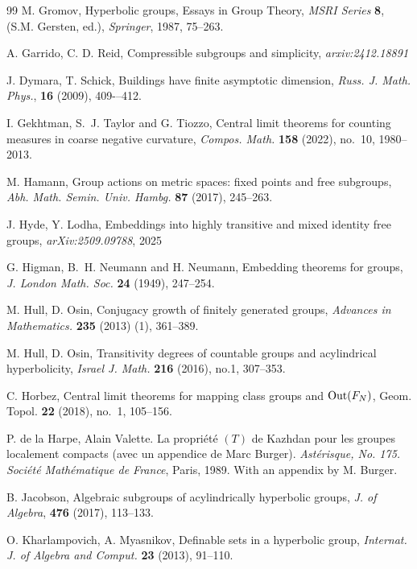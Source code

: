 \documentclass[11pt,letterpaper]{article}
\theoremstyle{definition}
\theoremstyle{remark}
\begin{document}
\begin{thebibliography}{99}
M. Gromov, Hyperbolic groups, Essays in Group Theory, \emph{MSRI Series} \textbf{8}, (S.M. Gersten, ed.), \emph{Springer}, 1987, 75--263.

A. Garrido, C. D. Reid, Compressible subgroups and simplicity, {\it arxiv:2412.18891}

J. Dymara, T. Schick, Buildings have finite asymptotic dimension, \emph{Russ. J. Math. Phys.}, \textbf{16} (2009), 409-–412.

I. Gekhtman, S.~J. Taylor and G. Tiozzo, Central limit theorems for counting measures in coarse negative curvature, \emph{Compos. Math.} {\bf 158} (2022), no.~10, 1980--2013.


M. Hamann, Group actions on metric spaces: fixed points and free subgroups, \emph{Abh. Math. Semin. Univ. Hambg.} \textbf{87} (2017), 245--263.

J. Hyde, Y. Lodha, Embeddings into highly transitive and mixed identity free groups, \emph{arXiv:2509.09788}, 2025

G. Higman, B.~H. Neumann and H. Neumann, Embedding theorems for groups, \emph{J. London Math. Soc.} {\bf 24} (1949), 247--254.

M. Hull, D. Osin, Conjugacy growth of finitely generated groups, \emph{Advances in Mathematics.} \textbf{235} (2013) (1), 361--389.

M. Hull, D. Osin, Transitivity degrees of countable groups and acylindrical hyperbolicity, \emph{Israel J. Math.} \textbf{216} (2016), no.1, 307--353.

C. Horbez, Central limit theorems for mapping class groups and ${\rm Out}(F_N)$, Geom. Topol. {\bf 22} (2018), no.~1, 105--156.

P. de la Harpe, Alain Valette. La propriété $(T)$ de Kazhdan pour les groupes localement compacts (avec un appendice de Marc Burger).\emph{ Astérisque, No. 175. Société Mathématique de France}, Paris, 1989. With an appendix by M. Burger.

B. Jacobson, Algebraic subgroups of acylindrically hyperbolic groups, \emph{J. of Algebra}, \textbf{476} (2017), 113--133.

O. Kharlampovich, A. Myasnikov, Definable sets in a hyperbolic group, \emph{Internat. J. of Algebra and Comput.} \textbf{23} (2013), 91--110.


\end{thebibliography}
\end{document}

